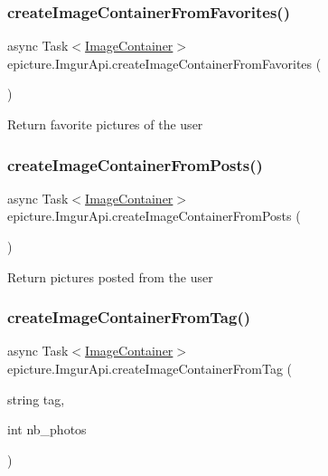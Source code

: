 \subsubsection{\texorpdfstring{create\+Image\+Container\+From\+Favorites()}{createImageContainerFromFavorites()}}
{\footnotesize\ttfamily async Task$<$\mbox{\hyperlink{classepicture_1_1_image_container}{Image\+Container}}$>$ epicture.\+Imgur\+Api.\+create\+Image\+Container\+From\+Favorites (\begin{DoxyParamCaption}{ }\end{DoxyParamCaption})}

Return favorite pictures of the user \mbox{\label{classepicture_1_1_imgur_api_a7d7e217e9bbe707827de3f3222245ba8}} 
\subsubsection{\texorpdfstring{create\+Image\+Container\+From\+Posts()}{createImageContainerFromPosts()}}
{\footnotesize\ttfamily async Task$<$\mbox{\hyperlink{classepicture_1_1_image_container}{Image\+Container}}$>$ epicture.\+Imgur\+Api.\+create\+Image\+Container\+From\+Posts (\begin{DoxyParamCaption}{ }\end{DoxyParamCaption})}

Return pictures posted from the user \mbox{\label{classepicture_1_1_imgur_api_ac4db02936c30dfc87f1b5557f7a7af75}} 
\subsubsection{\texorpdfstring{create\+Image\+Container\+From\+Tag()}{createImageContainerFromTag()}}
{\footnotesize\ttfamily async Task$<$\mbox{\hyperlink{classepicture_1_1_image_container}{Image\+Container}}$>$ epicture.\+Imgur\+Api.\+create\+Image\+Container\+From\+Tag (\begin{DoxyParamCaption}\item[{string}]{tag,  }\item[{int}]{nb\+\_\+photos }\end{DoxyParamCaption})}

